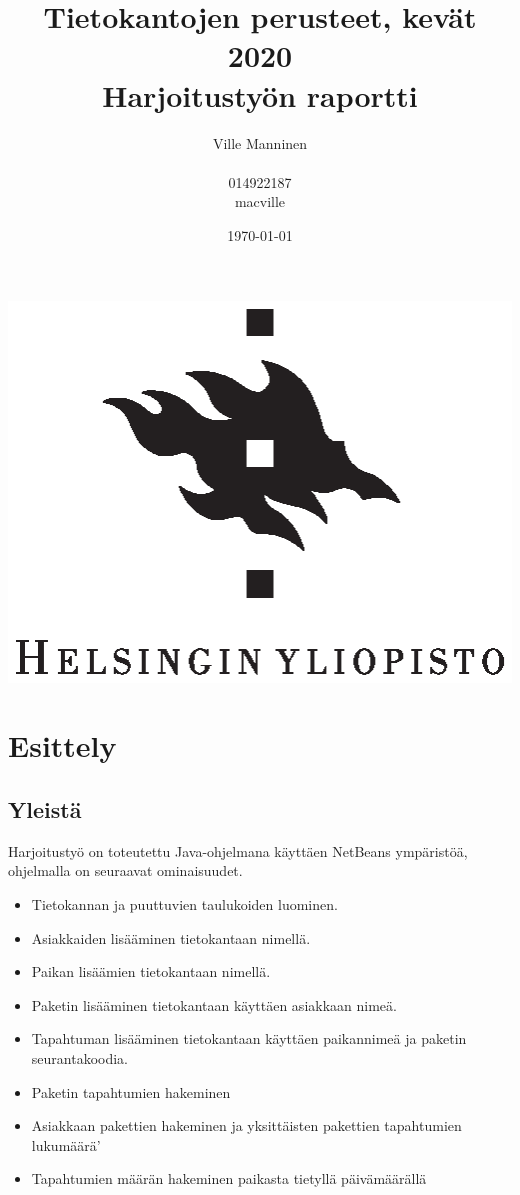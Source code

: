 \documentclass[11pt,a4paper]{article}
\begin{document}
\title{Tietokantojen perusteet, kevät 2020 \\
Harjoitustyön raportti}
\author{Ville Manninen\\ \\014922187 \\macville}
\date{\today}
\clearpage\maketitle
\begin{center}
\vspace{2cm}
\includegraphics{university-of-helsinki-2.eps} 
\end{center}
\thispagestyle{empty}
\newpage
\tableofcontents
\newpage
\section{Esittely}
\subsection*{Yleistä}
Harjoitustyö on toteutettu Java-ohjelmana käyttäen NetBeans ympäristöä, ohjelmalla on seuraavat ominaisuudet.
\begin{itemize}
\item Tietokannan ja puuttuvien taulukoiden luominen.
\item Asiakkaiden lisääminen tietokantaan nimellä.
\item Paikan lisäämien tietokantaan nimellä.
\item Paketin lisääminen tietokantaan käyttäen asiakkaan nimeä.
\item Tapahtuman lisääminen tietokantaan käyttäen paikannimeä ja paketin seurantakoodia.
\item Paketin tapahtumien hakeminen
\item Asiakkaan pakettien hakeminen ja yksittäisten pakettien tapahtumien lukumäärä'
\item Tapahtumien määrän hakeminen paikasta tietyllä päivämäärällä
\end{itemize}
\newpage
\end{document}
